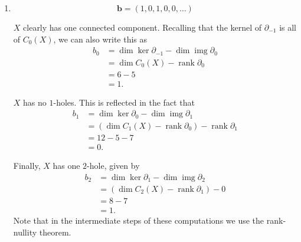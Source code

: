 \documentclass[12 pt, letterpaper]{hmcpset}
\begin{document}
\begin{solution}
\begin{enumerate}
			Let the $0$-chains be given by the following basis
			\[
				C_{0}(X) = \operatorname{span}([1], [-1], [2], [-2], [3], [-2]),
			\]
			the $1$-chains by
			\[
				C_{1}(X) = \operatorname{span}([1, 2], [-1, 2], [1, -2], [-1, -2], [2, 3], \dots, [-2, -3],  [3, 1], \dots, [-3, -1]),
			\]
			and the $2$-chains by
			\[
				C_{2}(X) = \operatorname{span}([1, 2, 3], [-1, 2, 3], [1, -2, 3], [1, 2, -3], [1, -2, -3] [-1, 2, -3], [-1, -2, 3], [-1, -2, -3]).
			\]

			Then we can compute the matrices using the definition of the boundary map and obtain their ranks using computer tools.

			Note that since $X$ is $2$-dimensional, we have $C_{3}(X) = 0$, and thus, $\partial_{2} : C_{3}(X) \to C_{2}(X)$ is the zero map.

		\item
			\[
				\boxed{
					\mathbf{b} = (1, 0, 1, 0, 0, \dots)
				}
			\]

			$X$ clearly has one connected component. Recalling that the kernel of $\partial_{-1}$ is all of $C_{0}(X)$, we can also write this as
			\begin{align*}
				b_{0} & = \dim \ker \partial_{-1} - \dim \operatorname{img} \partial_{0} \\
				      & = \dim C_{0}(X) - \operatorname{rank} \partial_{0} \\
				      & = 6 - 5 \\
				      & = 1.
			\end{align*}

			$X$ has no $1$-holes. This is reflected in the fact that
			\begin{align*}
				b_{1} & = \dim \ker \partial_{0} - \dim \operatorname{img} \partial_{1} \\
				      & = (\dim C_{1}(X) - \operatorname{rank} \partial_{0}) - \operatorname{rank} \partial_{1} \\
				      & = 12 - 5 - 7 \\
				      & = 0.
			\end{align*}

			Finally, $X$ has one $2$-hole, given by
			\begin{align*}
				b_{2} & = \dim \ker \partial_{1} - \dim \operatorname{img} \partial_{2} \\
				      & = (\dim C_{2}(X) - \operatorname{rank} \partial_{1}) - 0 \\
				      & = 8 - 7 \\
				      & = 1.
			\end{align*}
			Note that in the intermediate steps of these computations we use the rank-nullity theorem.
	\end{enumerate}
\end{solution}
\end{document}
